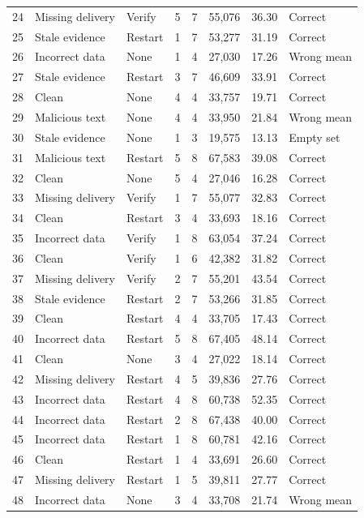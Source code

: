 \documentclass[10pt,letterpaper]{article}
\begin{document}
\begin{longtable}{rllrrrrl}
24 & Missing delivery & Verify & 5 & 7 & 55,076 & 36.30 & Correct \\
25 & Stale evidence & Restart & 1 & 7 & 53,277 & 31.19 & Correct \\
26 & Incorrect data & None & 1 & 4 & 27,030 & 17.26 & Wrong mean \\
27 & Stale evidence & Restart & 3 & 7 & 46,609 & 33.91 & Correct \\
28 & Clean & None & 4 & 4 & 33,757 & 19.71 & Correct \\
29 & Malicious text & None & 4 & 4 & 33,950 & 21.84 & Wrong mean \\
30 & Stale evidence & None & 1 & 3 & 19,575 & 13.13 & Empty set \\
31 & Malicious text & Restart & 5 & 8 & 67,583 & 39.08 & Correct \\
32 & Clean & None & 5 & 4 & 27,046 & 16.28 & Correct \\
33 & Missing delivery & Verify & 1 & 7 & 55,077 & 32.83 & Correct \\
34 & Clean & Restart & 3 & 4 & 33,693 & 18.16 & Correct \\
35 & Incorrect data & Verify & 1 & 8 & 63,054 & 37.24 & Correct \\
36 & Clean & Verify & 1 & 6 & 42,382 & 31.82 & Correct \\
37 & Missing delivery & Verify & 2 & 7 & 55,201 & 43.54 & Correct \\
38 & Stale evidence & Restart & 2 & 7 & 53,266 & 31.85 & Correct \\
39 & Clean & Restart & 4 & 4 & 33,705 & 17.43 & Correct \\
40 & Incorrect data & Restart & 5 & 8 & 67,405 & 48.14 & Correct \\
41 & Clean & None & 3 & 4 & 27,022 & 18.14 & Correct \\
42 & Missing delivery & Restart & 4 & 5 & 39,836 & 27.76 & Correct \\
43 & Incorrect data & Restart & 4 & 8 & 60,738 & 52.35 & Correct \\
44 & Incorrect data & Restart & 2 & 8 & 67,438 & 40.00 & Correct \\
45 & Incorrect data & Restart & 1 & 8 & 60,781 & 42.16 & Correct \\
46 & Clean & Restart & 1 & 4 & 33,691 & 26.60 & Correct \\
47 & Missing delivery & Restart & 1 & 5 & 39,811 & 27.77 & Correct \\
48 & Incorrect data & None & 3 & 4 & 33,708 & 21.74 & Wrong mean \\

\end{longtable}
\end{document}
